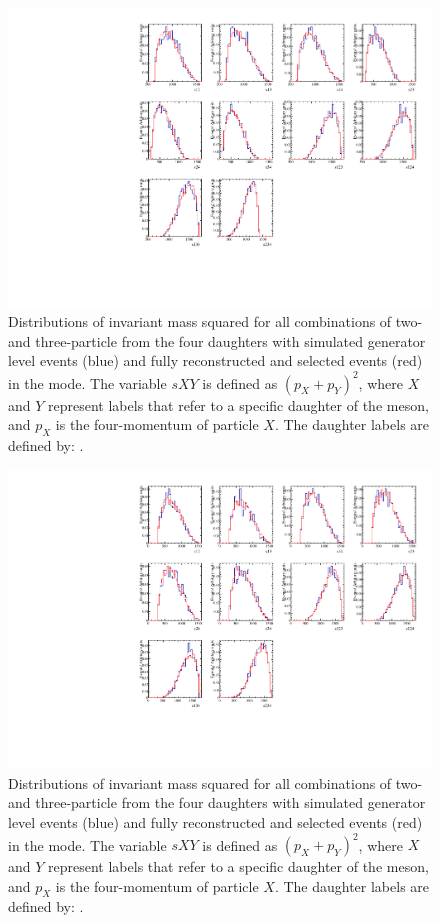 \begin{figure}[h]
\centering
\includegraphics[width=0.9\linewidth]{figures/results/dalitzDist_KPiPiPi.pdf}
\caption{Distributions of invariant mass squared for all combinations of two- and three-particle from the four \Dz daughters with simulated generator level events (blue) and fully reconstructed and selected events (red) in the \kpipipi mode. The variable $sXY$ is defined as $(p_X + p_Y)^2$, where $X$ and $Y$ represent labels that refer to a specific daughter of the \Dz meson, and $p_X$ is the four-momentum of particle $X$. The \Dz daughter labels are defined by: .}
\label{dalitzk3pi}
\end{figure}

\begin{figure}[h]
\centering
\includegraphics[width=0.9\linewidth]{figures/results/dalitzDist_PiPiPiPi.pdf}
\caption{Distributions of invariant mass squared for all combinations of two- and three-particle from the four \Dz daughters with simulated generator level events (blue) and fully reconstructed and selected events (red) in the \pipipipi mode. The variable $sXY$ is defined as $(p_X + p_Y)^2$, where $X$ and $Y$ represent labels that refer to a specific daughter of the \Dz meson, and $p_X$ is the four-momentum of particle $X$. The \Dz daughter labels are defined by: .}
\label{dalitz4pi}
\end{figure}

